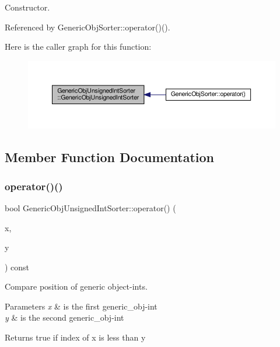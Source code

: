 Constructor. 



Referenced by Generic\+Obj\+Sorter\+::operator()().

Here is the caller graph for this function\+:
\nopagebreak
\begin{figure}[H]
\begin{center}
\leavevmode
\includegraphics[width=350pt]{d3/daf/classGenericObjUnsignedIntSorter_a687f9d0730b79238b158ed00c6301ec9_icgraph}
\end{center}
\end{figure}


\subsection{Member Function Documentation}
\mbox{\label{classGenericObjUnsignedIntSorter_ad711ca8ecd00c381d2af88dd02efffbf}} 
\subsubsection{\texorpdfstring{operator()()}{operator()()}}
{\footnotesize\ttfamily bool Generic\+Obj\+Unsigned\+Int\+Sorter\+::operator() (\begin{DoxyParamCaption}\item[{const std\+::pair$<$ \hyperlink{generic__obj_8hpp_acb533b2ef8e0fe72e09a04d20904ca81}{generic\+\_\+obj\+Ref}, int $>$ \&}]{x,  }\item[{const std\+::pair$<$ \hyperlink{generic__obj_8hpp_acb533b2ef8e0fe72e09a04d20904ca81}{generic\+\_\+obj\+Ref}, int $>$ \&}]{y }\end{DoxyParamCaption}) const}



Compare position of generic object-\/ints. 


\begin{DoxyParams}{Parameters}
{\em x} & is the first generic\+\_\+obj-\/int \\
\hline
{\em y} & is the second generic\+\_\+obj-\/int \\
\hline
\end{DoxyParams}
\begin{DoxyReturn}{Returns}
true if index of x is less than y 
\end{DoxyReturn}


